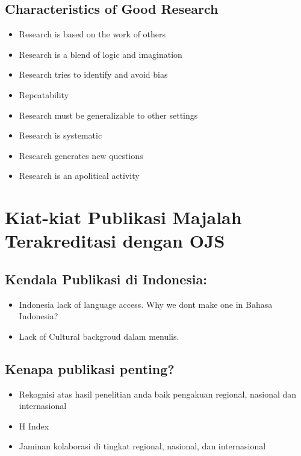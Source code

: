 \documentclass[
  letterpaper,
  DIV=11,
  numbers=noendperiod]{scrreprt}
\providecommand{\tightlist}{%
  \setlength{\itemsep}{0pt}\setlength{\parskip}{0pt}}\usepackage{longtable,booktabs,array}
\begin{document}
\subsection{Characteristics of Good
Research}\label{characteristics-of-good-research}

\begin{itemize}
\tightlist
\item
  Research is based on the work of others
\item
  Research is a blend of logic and imagination
\item
  Research tries to identify and avoid bias
\item
  Repeatability
\item
  Research must be generalizable to other settings
\item
  Research is systematic
\item
  Research generates new questions
\item
  Research is an apolitical activity
\end{itemize}

\section{Kiat-kiat Publikasi Majalah Terakreditasi dengan
OJS}\label{kiat-kiat-publikasi-majalah-terakreditasi-dengan-ojs}

\subsection{Kendala Publikasi di
Indonesia:}\label{kendala-publikasi-di-indonesia}

\begin{itemize}
\tightlist
\item
  Indonesia lack of language access. Why we dont make one in Bahasa
  Indonesia?
\item
  Lack of Cultural backgroud dalam menulis.
\end{itemize}

\subsection{Kenapa publikasi penting?}\label{kenapa-publikasi-penting}

\begin{itemize}
\tightlist
\item
  Rekognisi atas hasil penelitian anda baik pengakuan regional, nasional
  dan internasional
\item
  H Index
\item
  Jaminan kolaborasi di tingkat regional, nasional, dan internasional
\end{itemize}
\end{document}
